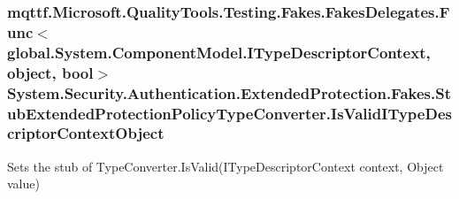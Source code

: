 \hypertarget{class_system_1_1_security_1_1_authentication_1_1_extended_protection_1_1_fakes_1_1_stub_extendedf67afed15bbc0df07bfc91316f6f81f0_a965e48d92fa9ea9e5d95497b3fc9ec8e}{
\subsubsection[{Is\-Valid\-I\-Type\-Descriptor\-Context\-Object}]{\setlength{\rightskip}{0pt plus 5cm}mqttf.\-Microsoft.\-Quality\-Tools.\-Testing.\-Fakes.\-Fakes\-Delegates.\-Func$<$global.\-System.\-Component\-Model.\-I\-Type\-Descriptor\-Context, object, bool$>$ System.\-Security.\-Authentication.\-Extended\-Protection.\-Fakes.\-Stub\-Extended\-Protection\-Policy\-Type\-Converter.\-Is\-Valid\-I\-Type\-Descriptor\-Context\-Object}}\label{class_system_1_1_security_1_1_authentication_1_1_extended_protection_1_1_fakes_1_1_stub_extendedf67afed15bbc0df07bfc91316f6f81f0_a965e48d92fa9ea9e5d95497b3fc9ec8e}


Sets the stub of Type\-Converter.\-Is\-Valid(\-I\-Type\-Descriptor\-Context context, Object value)



